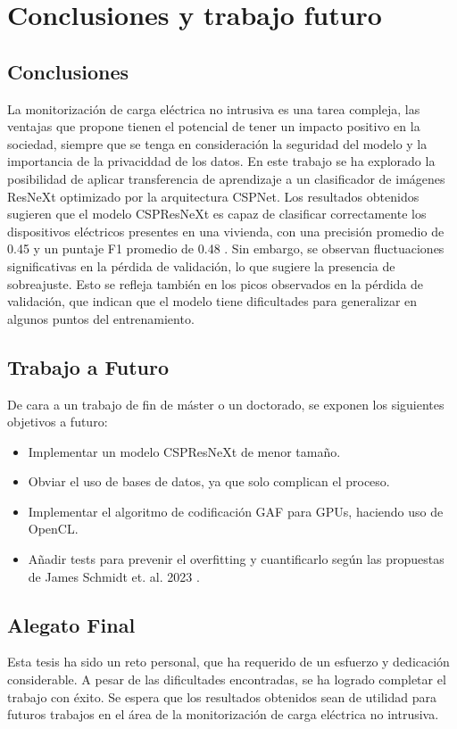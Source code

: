 \chapter{Conclusiones y trabajo futuro}

\section{Conclusiones}
La monitorización de carga eléctrica no intrusiva es una tarea compleja, las ventajas que propone tienen el potencial de tener un impacto positivo en la sociedad, siempre que se tenga en consideración la seguridad del modelo y la importancia de la privaciddad de los datos. En este trabajo se ha explorado la posibilidad de aplicar transferencia de aprendizaje a un clasificador de imágenes ResNeXt optimizado por la arquitectura CSPNet. Los resultados obtenidos sugieren que el modelo CSPResNeXt es capaz de clasificar correctamente los dispositivos eléctricos presentes en una vivienda, con una precisión promedio de 0.45 y un puntaje F1 promedio de 0.48 . Sin embargo, se observan fluctuaciones significativas en la pérdida de validación, lo que sugiere la presencia de sobreajuste. Esto se refleja también en los picos observados en la pérdida de validación, que indican que el modelo tiene dificultades para generalizar en algunos puntos del entrenamiento.


\section{Trabajo a Futuro}
De cara a un trabajo de fin de máster o un doctorado, se exponen los siguientes objetivos a futuro:
\begin{itemize}
    \item Implementar un modelo CSPResNeXt de menor tamaño.
    \item Obviar el uso de bases de datos, ya que solo complican el proceso.
    \item Implementar el algoritmo de codificación GAF para GPUs, haciendo uso de OpenCL.
    \item Añadir tests para prevenir el overfitting y cuantificarlo según las propuestas de James Schmidt et. al. 2023 \autocite{schmidt2023testing}.
\end{itemize}

\section{Alegato Final}
Esta tesis ha sido un reto personal, que ha requerido de un esfuerzo y dedicación considerable. A pesar de las dificultades encontradas, se ha logrado completar el trabajo con éxito. Se espera que los resultados obtenidos sean de utilidad para futuros trabajos en el área de la monitorización de carga eléctrica no intrusiva.
